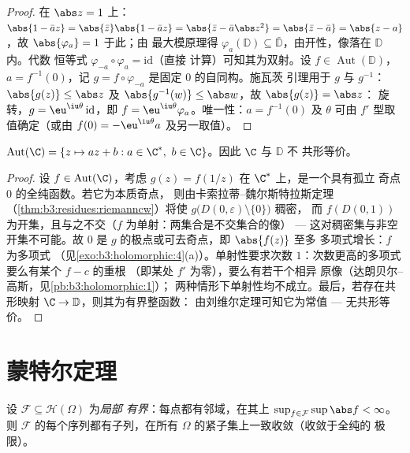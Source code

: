 \begin{proof}
在 $\abs z = 1$ 上：$\abs{1 - \bar az} = \abs{\bar z}\abs{1 -
\bar az} = \abs{\bar z - \bar a\abs z^2} = \abs{\bar z - \bar
a} = \abs{z - a}$，故 $\abs{\varphi_a} = 1$ 于此；由
最大模原理得 $\varphi_a(\mathbb D) \subseteq \bar{\mathbb
D}$，由开性，像落在 $\mathbb D$ 内。代数
恒等式 $\varphi_{-a}\circ\varphi_a = \mathrm{id}$（直接
计算）可知其为双射。设 $f \in
\operatorname{Aut}(\mathbb D)$，$a = f^{-1}(0)$，记 $g =
f\circ\varphi_{-a}$ 是固定 $0$ 的自同构。施瓦茨
引理用于 $g$ 与 $g^{-1}$：$\abs{g(z)} \leq \abs z$ 及
$\abs{g^{-1}(w)} \leq \abs w$，故 $\abs{g(z)} = \abs z$：
旋转，$g = \eu^{\iu\theta}\,\mathrm{id}$，即 $f =
\eu^{\iu\theta}\varphi_a$。唯一性：$a = f^{-1}(0)$ 及
$\theta$ 可由 $f'$ 型取值确定（或由 $f(0) =
-\eu^{\iu\theta}a$ 及另一取值）。
\end{proof}

\begin{theorem}[平面的自同构]
\label{thm:b3:conformal:autplane}
$\operatorname{Aut}(\C) = \{z \mapsto az + b : a \in \C^*,\ b
\in \C\}$。因此 $\C$ 与 $\mathbb D$ 不
共形等价。
\end{theorem}

\begin{proof}
设 $f \in \operatorname{Aut}(\C)$，考虑 $g(z) =
f(1/z)$ 在 $\C^*$ 上，是一个具有孤立
奇点 $0$ 的全纯函数。若它为本质奇点，
则由卡索拉蒂–魏尔斯特拉斯定理（\cref{thm:b3:residues:riemanncw}）将使
$g\bigl(D(0,\varepsilon)\setminus\{0\}\bigr)$ 稠密，
而 $f(D(0, 1))$ 为开集，且与之不交（$f$
为单射：两集合是不交集合的像） ---
这对稠密集与非空开集不可能。故 $0$ 是
$g$ 的极点或可去奇点，即 $\abs{f(z)}$ 至多
多项式增长：$f$ 为多项式
（见\cref{exo:b3:holomorphic:4}(a)）。单射性要求次数
$1$：次数更高的多项式要么有某个 $f - c$ 的重根
（即某处 $f'$ 为零），要么有若干个相异
原像（达朗贝尔–高斯，见\cref{pb:b3:holomorphic:1}）；
两种情形下单射性均不成立。最后，若存在共形映射 $\C \to
\mathbb D$，则其为有界整函数：
由刘维尔定理可知它为常值 --- 无共形等价。
\end{proof}

\section{蒙特尔定理}

\begin{theorem}[蒙特尔]\label{thm:b3:conformal:montel}
设 $\mathcal F \subseteq \mathcal H(\Omega)$ 为\emph{局部
有界}：每点都有邻域，在其上 $\sup_{f\in
\mathcal F}\sup\abs f < \infty$。则
$\mathcal F$ 的每个序列都有子列，在所有
$\Omega$ 的紧子集上一致收敛（收敛于全纯的
极限）。
\end{theorem}

